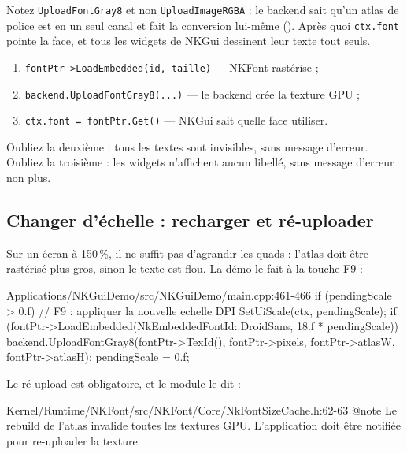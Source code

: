Notez \texttt{UploadFontGray8} et non \texttt{UploadImageRGBA} : le backend sait
qu'un atlas de police est en un seul canal et fait la conversion lui-même
().
Après quoi \texttt{ctx.font} pointe la face, et tous les widgets de NKGui
dessinent leur texte tout seuls.

\begin{nkretenir}
\begin{enumerate}
  \item \texttt{fontPtr->LoadEmbedded(id, taille)} — NKFont rastérise ;
  \item \texttt{backend.UploadFontGray8(...)} — le backend crée la texture GPU ;
  \item \texttt{ctx.font = fontPtr.Get()} — NKGui sait quelle face utiliser.
\end{enumerate}
Oubliez la deuxième : tous les textes sont invisibles, sans message d'erreur.
Oubliez la troisième : les widgets n'affichent aucun libellé, sans message
d'erreur non plus.
\end{nkretenir}

\subsection{Changer d'échelle : recharger et ré-uploader}

Sur un écran à 150\,\%, il ne suffit pas d'agrandir les quads : l'atlas doit être
rastérisé plus gros, sinon le texte est flou. La démo le fait à la touche F9 :

\begin{nkcode}{Applications/NKGuiDemo/src/NKGuiDemo/main.cpp:461-466}
        if (pendingScale > 0.f) { // F9 : appliquer la nouvelle echelle DPI
            SetUiScale(ctx, pendingScale);
            if (fontPtr->LoadEmbedded(NkEmbeddedFontId::DroidSans, 18.f * pendingScale))
                backend.UploadFontGray8(fontPtr->TexId(), fontPtr->pixels, fontPtr->atlasW, fontPtr->atlasH);
            pendingScale = 0.f;
        }
\end{nkcode}

Le ré-upload est obligatoire, et le module le dit :

\begin{nkcode}{Kernel/Runtime/NKFont/src/NKFont/Core/NkFontSizeCache.h:62-63}
 @note Le rebuild de l'atlas invalide toutes les textures GPU.
       L'application doit être notifiée pour re-uploader la texture.
\end{nkcode}


